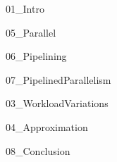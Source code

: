 \documentclass[b5paper,openany]{book}
\begin{document}
\frontmatter




\cleardoublepage


\patchcmd{\chapter}{\cleardoublepage}{\relax}{}{}
\patchcmd{\chapter}{\clearpage}{\relax}{}{}


\tableofcontents

\makeatletter
\renewcommand*\mainmatter{%
  \newpage
  \@mainmattertrue
}
\makeatother

\mainmatter

\AddChapterBoxes

\setcounter{page}{1}
\addtocounter{page}{-2}
{01_Intro}

{05_Parallel}

{06_Pipelining}

{07_PipelinedParallelism}

{03_WorkloadVariations}

{04_Approximation}

{08_Conclusion}
\end{document}

